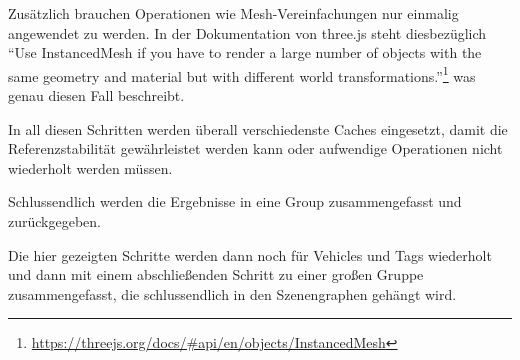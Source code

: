 Zusätzlich brauchen Operationen wie Mesh-Vereinfachungen nur einmalig angewendet zu werden.
In der Dokumentation von three.js steht diesbezüglich \enquote{Use InstancedMesh if you have to render a large number of objects with the same geometry and material but with different world transformations.}\footnote{\url{https://threejs.org/docs/\#api/en/objects/InstancedMesh}} was genau diesen Fall beschreibt.

In all diesen Schritten werden überall verschiedenste Caches eingesetzt, damit die Referenzstabilität gewährleistet werden kann oder aufwendige Operationen nicht wiederholt werden müssen.

Schlussendlich werden die Ergebnisse in eine Group zusammengefasst und zurückgegeben.

Die hier gezeigten Schritte werden dann noch für Vehicles und Tags wiederholt und dann mit einem abschließenden Schritt zu einer großen Gruppe zusammengefasst, die schlussendlich in den Szenengraphen gehängt wird.

\FloatBarrier
